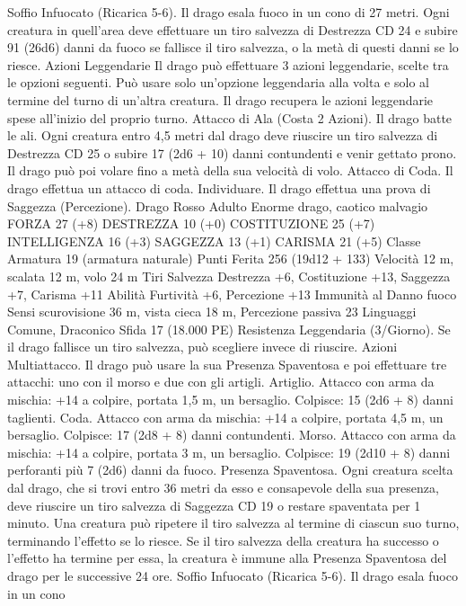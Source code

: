 \begin{multicols}{2}
Soffio Infuocato (Ricarica 5-6). Il drago esala fuoco in un cono
di 27 metri. Ogni creatura in quell’area deve effettuare un tiro
salvezza di Destrezza CD 24 e subire 91 (26d6) danni da fuoco
se fallisce il tiro salvezza, o la metà di questi danni se lo riesce.
Azioni Leggendarie
Il drago può effettuare 3 azioni leggendarie, scelte tra le opzioni
seguenti. Può usare solo un’opzione leggendaria alla volta e solo
al termine del turno di un’altra creatura. Il drago recupera le
azioni leggendarie spese all’inizio del proprio turno.
Attacco di Ala (Costa 2 Azioni). Il drago batte le ali. Ogni
creatura entro 4,5 metri dal drago deve riuscire un tiro salvezza
di Destrezza CD 25 o subire 17 (2d6 + 10) danni contundenti e
venir gettato prono. Il drago può poi volare fino a metà della sua
velocità di volo.
Attacco di Coda. Il drago effettua un attacco di coda.
Individuare. Il drago effettua una prova di Saggezza
(Percezione).
Drago Rosso Adulto
Enorme drago, caotico malvagio
FORZA 27 (+8)
DESTREZZA 10 (+0)
COSTITUZIONE 25 (+7)
INTELLIGENZA 16 (+3)
SAGGEZZA 13 (+1)
CARISMA 21 (+5)
Classe Armatura 19 (armatura naturale)
Punti Ferita 256 (19d12 + 133)
Velocità 12 m, scalata 12 m, volo 24 m
Tiri Salvezza Destrezza +6, Costituzione +13, Saggezza +7,
Carisma +11
Abilità Furtività +6, Percezione +13
Immunità al Danno fuoco
Sensi scurovisione 36 m, vista cieca 18 m, Percezione passiva 23
Linguaggi Comune, Draconico
Sfida 17 (18.000 PE)
Resistenza Leggendaria (3/Giorno). Se il drago fallisce un tiro
salvezza, può scegliere invece di riuscire.
Azioni
Multiattacco. Il drago può usare la sua Presenza Spaventosa e
poi effettuare tre attacchi: uno con il morso e due con gli artigli.
Artiglio. Attacco con arma da mischia: +14 a colpire, portata 1,5
m, un bersaglio.
Colpisce: 15 (2d6 + 8) danni taglienti.
Coda. Attacco con arma da mischia: +14 a colpire, portata 4,5
m, un bersaglio.
Colpisce: 17 (2d8 + 8) danni contundenti.
Morso. Attacco con arma da mischia: +14 a colpire, portata 3 m,
un bersaglio.
Colpisce: 19 (2d10 + 8) danni perforanti più 7 (2d6) danni da
fuoco.
Presenza Spaventosa. Ogni creatura scelta dal drago, che si trovi
entro 36 metri da esso e consapevole della sua presenza, deve
riuscire un tiro salvezza di Saggezza CD 19 o restare spaventata
per 1 minuto. Una creatura può ripetere il tiro salvezza al termine
di ciascun suo turno, terminando l’effetto se lo riesce. Se il tiro
salvezza della creatura ha successo o l’effetto ha termine per
essa, la creatura è immune alla Presenza Spaventosa del drago
per le successive 24 ore.
Soffio Infuocato (Ricarica 5-6). Il drago esala fuoco in un cono

\end{multicols}
